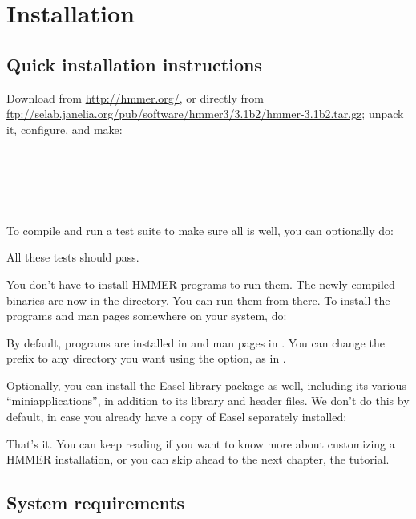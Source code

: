 \section{Installation}
\label{section:installation}
\setcounter{footnote}{0}

\subsection{Quick installation instructions}

Download  from \url{http://hmmer.org/}, or
directly from
\url{ftp://selab.janelia.org/pub/software/hmmer3/3.1b2/hmmer-3.1b2.tar.gz};
unpack it, configure, and make:

\\
\\
\\
\\ 

To compile and run a test suite to make sure all is well, you can
optionally do:


All these tests should pass.

You don't have to install HMMER programs to run them. The newly
compiled binaries are now in the  directory. You can run
them from there. To install the programs and man pages somewhere on
your system, do:


By default, programs are installed in  and man
pages in . You can change the
 prefix to any directory you want using the
 option, as in .

Optionally, you can install the Easel library package as well,
including its various ``miniapplications'', in addition to its library
and header files. We don't do this by default, in case you already
have a copy of Easel separately installed:


That's it.  You can keep reading if you want to know more about
customizing a HMMER installation, or you can skip ahead to the next
chapter, the tutorial.

\subsection{System requirements}

